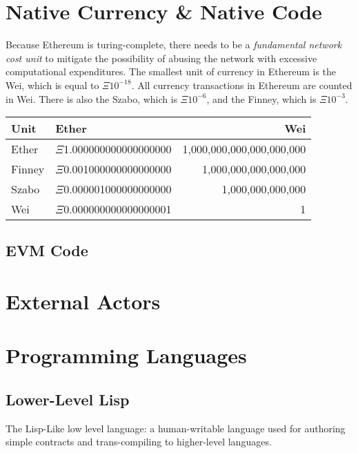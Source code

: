 \documentclass[10pt,a4paper,leqno,bibliography=totoc]{scrartcl}
\makeatletter
\let\mcnewpage=\newpage
\newcommand{\TrickSupertabularIntoMulticols}{%
\renewcommand\newpage{%
	      \if@firstcolumn
	            \hrule width\linewidth height0pt
          \columnbreak
      \else
        \mcnewpage
       \fi
  }%
 }
\newenvironment{alphafootnotes}
{\par\edef\savedfootnotenumber{\number\value{footnote}}
\renewcommand{\thefootnote}{\alph{footnote}}
\setcounter{footnote}{0}}
{\par\setcounter{footnote}{\savedfootnotenumber}}
\makeatother
\begin{document}
\begin{alphafootnotes}
\clearpage

\tableofcontents

\clearpage

\begin{multicols*}{2}
\TrickSupertabularIntoMulticols
\justify


			

	\section{Native Currency \& Native Code}
		Because Ethereum is turing-complete, there needs to be a \textsl{fundamental network cost unit} to mitigate the possibility of abusing the network with excessive computational expenditures. The smallest unit of currency in Ethereum is the Wei, which is equal to $\Xi10^{-18}$. All currency transactions in Ethereum are counted in Wei. There  is also the Szabo, which is $\Xi10^{-6}$,  and the Finney, which is $\Xi10^{-3}$. \\ 
		\begin{tabular}{llr}
			\toprule
			\textbf{Unit} & \textbf{Ether} & \textbf{Wei} \\
			\midrule
			\scriptsize{Ether} & \scriptsize{$\Xi$1.000000000000000000} & \scriptsize{1,000,000,000,000,000,000} \\		
			\scriptsize{Finney} & \scriptsize{$\Xi$0.001000000000000000} & \scriptsize{1,000,000,000,000,000} \\
			\scriptsize{Szabo} & \scriptsize{$\Xi$0.000001000000000000} & \scriptsize{1,000,000,000,000} \\
			\scriptsize{Wei} & \scriptsize{$\Xi$0.000000000000000001} & \scriptsize{1} \\
			\bottomrule
		\end{tabular}

		\subsection{EVM Code}

	\section{External Actors} 	\section{Programming Languages}

		\subsection{Lower-Level Lisp}
			The Lisp-Like low level language: a human-writable language used for authoring simple contracts and trans-compiling to higher-level languages.
	

\end{multicols*}
\end{alphafootnotes}
\end{document}
